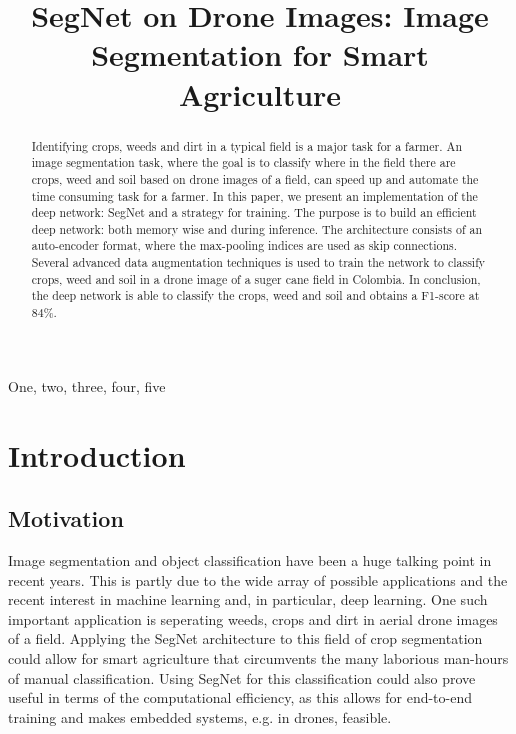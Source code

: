 \documentclass{article}
\title{SegNet on Drone Images: Image Segmentation for Smart Agriculture}
\begin{document}
%

\maketitle
%
\begin{abstract}
 Identifying crops, weeds and dirt in a typical field is a major task for a farmer. An image segmentation task, where the goal is to classify where in the field there are crops, weed and soil based on drone images of a field, can speed up and automate the time consuming task for a farmer. In this paper, we present an implementation of the deep network: SegNet and a strategy for training. The purpose is to build an efficient deep network: both memory wise and during inference. The architecture consists of an auto-encoder format, where the max-pooling indices are used as skip connections. Several advanced data augmentation techniques is used to train the network to classify crops, weed and soil in a drone image of a suger cane field in Colombia. In conclusion, the deep network is able to classify the crops, weed and soil and obtains a F1-score at $ 84 \% $. 
\end{abstract}
%
\begin{keywords}
One, two, three, four, five
\end{keywords}
%
\section{Introduction}
\label{sec:intro}

\subsection{Motivation}
Image segmentation and object classification have been a huge talking point in recent years. This is partly due to the wide array of possible applications and the recent interest in machine learning and, in particular, deep learning. One such important application is seperating weeds, crops and dirt in aerial drone images of a field. Applying the SegNet architecture to this field of crop segmentation could allow for smart agriculture that circumvents the many laborious man-hours of manual classification. Using SegNet for this classification could also prove useful in terms of the computational efficiency, as this allows for end-to-end training and makes embedded systems, e.g. in drones, feasible.
\end{document}
